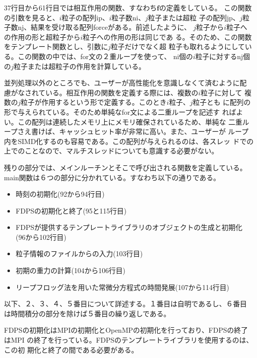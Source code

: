 \documentclass[12pt,a4paper]{jarticle}
\begin{document}
37行目から61行目では相互作用の関数、すなわち$\bm{f}$の定義をしている。
この関数の引数を見ると、$i$粒子の配列ip、$i$粒子数ni、$j$粒子または超粒
子の配列jp、$j$粒子数nj、結果を受け取る配列forceがある。前述したように、
$j$粒子から$i$粒子への作用の形と超粒子から$i$粒子への作用の形は同じであ
る。そのため、この関数をテンプレート関数とし、引数に$j$粒子だけでなく超
粒子も取れるようにしている。この関数の中では、for文の２重ループを使って、
ni個の$i$粒子に対するnj個の$j$粒子または超粒子の作用を計算している。

並列処理以外のところでも、ユーザーが高性能化を意識しなくて済むように配
慮がなされている。相互作用の関数を定義する際には、複数の$i$粒子に対して
複数の$j$粒子が作用するという形で定義する。このとき$i$粒子、$j$粒子とも
に配列の形で与えられている。そのため単純なfor文による二重ループを記述す
ればよい。この配列は連続したメモリ上にメモリ確保されているため、単純な
二重ループさえ書けば、キャッシュヒット率が非常に高い。また、ユーザーが
ループ内をSIMD化するのも容易である。この配列が与えられるのは、各スレッ
ドでの上でのことなので、マルチスレッドについても意識する必要がない。

残りの部分では、メインルーチンとそこで呼び出される関数を定義している。
main関数は６つの部分に分かれている。すなわち以下の通りである。
\begin{itemize}
\item 時刻の初期化(92から94行目)
\item FDPSの初期化と終了(95と115行目)
\item FDPSが提供するテンプレートライブラリのオブジェクトの生成と初期化
  (96から102行目)
\item 粒子情報のファイルからの入力(103行目)
\item 初期の重力の計算(104から106行目)
\item リープフロッグ法を用いた常微分方程式の時間発展(107から114行目)
\end{itemize}
以下、２、３、４、５番目について詳述する。１番目は自明であるし、６番目
は時間積分の部分を除けば５番目の繰り返しである。

FDPSの初期化はMPIの初期化とOpenMPの初期化を行っており、FDPSの終了はMPI
の終了を行っている。FDPSのテンプレートライブラリを使用するのは、この初
期化と終了の間である必要がある。
\end{document}
